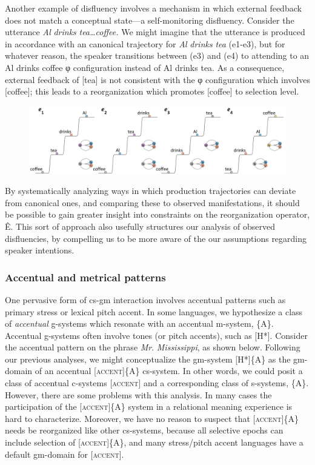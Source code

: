   Another example of disfluency involves a mechanism in which external feedback does not match a conceptual state—a self-monitoring disfluency. Consider the utterance \textit{Al} \textit{drinks} \textit{tea…coffee.} We might imagine that the utterance is produced in accordance with an canonical trajectory for \textit{Al} \textit{drinks} \textit{tea} (e1-e3), but for whatever reason, the speaker transitions between (e3) and (e4) to attending to an {\textbar}Al drinks coffee{\textbar} φ configuration instead of {\textbar}Al drinks tea{\textbar}. As a consequence, external feedback of [tea] is not consistent with the φ configuration which involves [coffee]; this leads to a reorganization which promotes [coffee] to selection level.

  
\begin{figure}
\includegraphics[width=\textwidth]{figures/Tilsen-img62.png}
\caption{\missingcaption}
\label{fig:}
\end{figure}
 

  By systematically analyzing ways in which production trajectories can deviate from canonical ones, and comparing these to observed manifestations, it should be possible to gain greater insight into constraints on the reorganization operator, Ê. This sort of approach also usefully structures our analysis of observed disfluencies, by compelling us to be more aware of the our assumptions regarding speaker intentions.

\subsubsection{Accentual and metrical patterns}

One pervasive form of cs-gm interaction involves accentual patterns such as primary stress or lexical pitch accent. In some languages, we hypothesize a class of \textit{accentual} g-systems which resonate with an accentual m-system, \{A\}. Accentual g-systems often involve tones (or pitch accents), such as [H*]. Consider the accentual pattern on the phrase \textit{Mr}. \textit{Mississippi}, as shown below. Following our previous analyses, we might conceptualize the gm-system [H*]\{A\} as the gm-domain of an accentual [\textsc{accent}]\{A\} cs-system. In other words, we could posit a class of accentual c-systems [\textsc{accent}] and a corresponding class of s-systems, \{A\}. However, there are some problems with this analysis. In many cases the participation of the [\textsc{accent}]\{A\} system in a relational meaning experience is hard to characterize. Moreover, we have no reason to suspect that [\textsc{accent}]\{A\} needs be reorganized like other cs-systems, because all selective epochs can include selection of [\textsc{accent}]\{A\}, and many stress/pitch accent languages have a default gm-domain for [\textsc{accent}].

